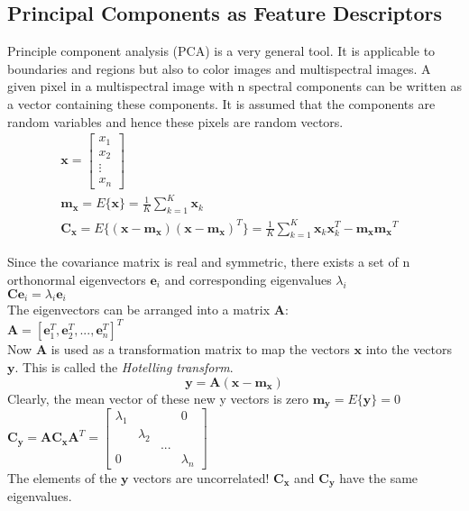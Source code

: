 \subsection{Principal Components as Feature Descriptors}
Principle component analysis (PCA) is a very general tool. It is applicable to boundaries and regions but also to color images and multispectral images. A given pixel in a multispectral image with n spectral components can be written as a vector containing these components. It is assumed that the components are random variables and hence these pixels are random vectors.
\begin{align*}
& \mathbf{x} = \left[\begin{array}{c} x_1 \\ x_2 \\ \vdots \\ x_n \end{array}\right]&&\\
& \mathbf{m_x} = E\{\mathbf{x}\} = \frac{1}{K}\sum\limits_{k=1}^{K}\mathbf{x}_k&&\\
& \mathbf{C_x} = E\{(\mathbf{x}-\mathbf{m_x})(\mathbf{x}-\mathbf{m_x})^T\}=\frac{1}{K}\sum\limits_{k=1}^{K}\mathbf{x}_k\mathbf{x}_k^T-\mathbf{m_x}\mathbf{m_x}^T
\end{align*}

Since the covariance matrix is real and symmetric, there exists a set of n orthonormal eigenvectors $\mathbf{e}_i$ and corresponding eigenvalues $\lambda_i$\\
$\mathbf{C}\mathbf{e}_i=\lambda_i\mathbf{e}_i$\\
The eigenvectors can be arranged into a matrix $\mathbf{A}$:\\
$\mathbf{A}=[\mathbf{e}_1^T, \mathbf{e}_2^T, ..., \mathbf{e}_n^T]^T$\\
Now $\mathbf{A}$ is used as a transformation matrix to map the vectors $\mathbf{x}$ into the vectors $\mathbf{y}$. This is called the \emph{Hotelling transform}. \\
	\[
		\mathbf{y}=\mathbf{A}(\mathbf{x}-\mathbf{m_x})
	\]
Clearly, the mean vector of these new y vectors is zero $\mathbf{m_y}=E\{\mathbf{y}\}=0$\\
$\mathbf{C_y}=\mathbf{AC_xA}^T=\left[
\begin{matrix}
 \lambda_1 & & & 0 \\
 & \lambda_2 & & \\
 & & ... & \\
 0 & & & \lambda_n
\end{matrix}\right]	$\\
The elements of the $\mathbf{y}$ vectors are uncorrelated! $\mathbf{C_x}$ and $\mathbf{C_y}$ have the same eigenvalues.

